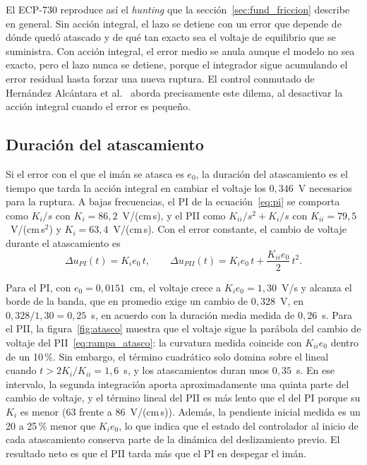 El ECP-730 reproduce así el \emph{hunting} que la sección~\ref{sec:fund_friccion} describe en general. Sin acción integral, el lazo se detiene con un error que depende de dónde quedó atascado y de qué tan exacto sea el voltaje de equilibrio que se suministra. Con acción integral, el error medio se anula aunque el modelo no sea exacto, pero el lazo nunca se detiene, porque el integrador sigue acumulando el error residual hasta forzar una nueva ruptura. El control conmutado de Hernández Alcántara et al.~\cite{alcantara} aborda precisamente este dilema, al desactivar la acción integral cuando el error es pequeño.

\subsection{Duración del atascamiento}

Si el error con el que el imán se atasca es $e_0$, la duración del atascamiento es el tiempo que tarda la acción integral en cambiar el voltaje los $0{,}346$~V necesarios para la ruptura. A bajas frecuencias, el PI de la ecuación~\eqref{eq:pi} se comporta como $K_i/s$ con $K_i=86{,}2$~V/(cm\,s), y el PII como $K_{ii}/s^2 + K_i/s$ con $K_{ii}=79{,}5$~V/(cm\,s$^2$) y $K_i=63{,}4$~V/(cm\,s). Con el error constante, el cambio de voltaje durante el atascamiento es
\begin{equation}
\Delta u_{PI}(t) = K_i e_0\, t, \qquad
\Delta u_{PII}(t) = K_i e_0\, t + \frac{K_{ii} e_0}{2}\, t^2 .
\label{eq:rampa_atasco}
\end{equation}

Para el PI, con $e_0=0{,}0151$~cm, el voltaje crece a $K_i e_0 = 1{,}30$~V/s y alcanza el borde de la banda, que en promedio exige un cambio de $0{,}328$~V, en $0{,}328/1{,}30=0{,}25$~s, en acuerdo con la duración media medida de $0{,}26$~s. Para el PII, la figura~\ref{fig:atasco} muestra que el voltaje sigue la parábola del cambio de voltaje del PII~\eqref{eq:rampa_atasco}: la curvatura medida coincide con $K_{ii}e_0$ dentro de un 10\,\%. Sin embargo, el término cuadrático solo domina sobre el lineal cuando $t > 2K_i/K_{ii} = 1{,}6$~s, y los atascamientos duran unos $0{,}35$~s. En ese intervalo, la segunda integración aporta aproximadamente una quinta parte del cambio de voltaje, y el término lineal del PII es más lento que el del PI porque su $K_i$ es menor (63 frente a 86~V/(cm\,s)). Además, la pendiente inicial medida es un 20 a 25\,\% menor que $K_i e_0$, lo que indica que el estado del controlador al inicio de cada atascamiento conserva parte de la dinámica del deslizamiento previo. El resultado neto es que el PII tarda más que el PI en despegar el imán.

